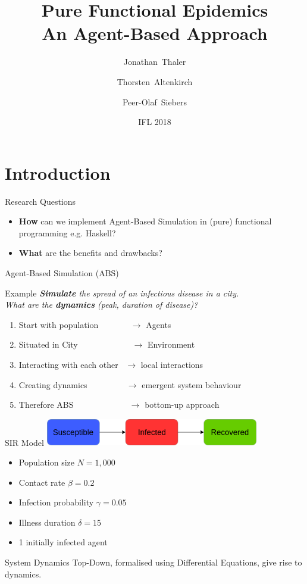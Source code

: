 \documentclass{beamer}
\title[Pure Functional Epidemics] 
{%
  Pure Functional Epidemics \\ An Agent-Based Approach%
}
\author[Thaler, Altenkirch, Siebers]
{
  Jonathan~Thaler \and
  Thorsten~Altenkirch \and
  Peer-Olaf~Siebers
}
\institute[University of Nottingham, United Kingdom]
{
  University of Nottingham, United Kingdom
}
\date[Implementation and Application of Functional Languages (IFL) 2018]
{IFL 2018}
\begin{document}
\begin{frame}
  \titlepage
\end{frame}

\section{Introduction}
\begin{frame}{Research Questions}
\begin{itemize}
  \item \textbf{How} can we implement Agent-Based Simulation in (pure) functional programming e.g. Haskell?
  \item \textbf{What} are the benefits and drawbacks?
\end{itemize}
\end{frame}

\begin{frame}{Agent-Based Simulation (ABS)} 
  \begin{block}{Example}
    \textit{\textbf{Simulate} the spread of an infectious disease in a city. \\ What are the \textbf{dynamics} (peak, duration of disease)?}
  \end{block}
  
  \begin{enumerate}
    \item Start with population \, \, \, \, \, \, \, $\to$ Agents
 	\item Situated in City \, \, \, \, \, \, \, \, \, \, \, \,\, $\to$ Environment
 	\item Interacting with each other \, $\to$ local interactions
 	\item Creating dynamics \, \, \, \, \, \, \, \,\,\, $\to$ emergent system behaviour
 	\item Therefore ABS \, \, \, \, \, \, \, \, \, \, \, \,\,\, $\to$ bottom-up approach
  \end{enumerate}
\end{frame}

\begin{frame}{SIR Model}
  \includegraphics[width=0.7\textwidth]{./fig/SIR_transitions.png}
  
  \begin{itemize}
    \item Population size $N = 1,000$
 	\item Contact rate $\beta = 0.2$
 	\item Infection probability $\gamma = 0.05$
 	\item Illness duration $\delta = 15$
 	\item 1 initially infected agent
  \end{itemize}
    
  \begin{block}{System Dynamics}
    Top-Down, formalised using Differential Equations, give rise to dynamics.
  \end{block}
\end{frame}
\end{document}
